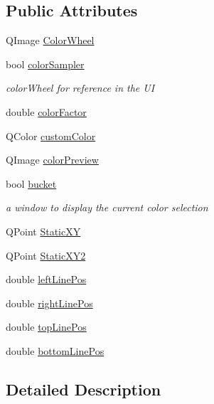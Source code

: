 \subsection*{Public Attributes}
\begin{DoxyCompactItemize}
\item 
Q\-Image \hyperlink{classworkingwindow_ab9ed1f2dafd42f388fc7b366d25db626}{Color\-Wheel}
\item 
bool \hyperlink{classworkingwindow_ab1e5dc3b626cb9e28983e6abee34d10d}{color\-Sampler}
\begin{DoxyCompactList}\small\item\em color\-Wheel for reference in the U\-I \end{DoxyCompactList}\item 
double \hyperlink{classworkingwindow_aee9919c1cfad4526c7b66c5f09b8ce02}{color\-Factor}
\item 
Q\-Color \hyperlink{classworkingwindow_a44fa7af5c036e2686e55c31a3b69e81f}{custom\-Color}
\item 
Q\-Image \hyperlink{classworkingwindow_a470b6dd89240fb31393ee848cef5a358}{color\-Preview}
\item 
bool \hyperlink{classworkingwindow_a48d7fd2e19079e21a8474ae0519f0862}{bucket}
\begin{DoxyCompactList}\small\item\em a window to display the current color selection \end{DoxyCompactList}\item 
Q\-Point \hyperlink{classworkingwindow_aa0c6e8030d9bb3b26324aaf737f2be62}{Static\-X\-Y}
\item 
Q\-Point \hyperlink{classworkingwindow_a0574618dfbe458eee7fac25620c2cf89}{Static\-X\-Y2}
\item 
double \hyperlink{classworkingwindow_a9e3b2de905cba0520347811c530958da}{left\-Line\-Pos}
\item 
double \hyperlink{classworkingwindow_ad140ff2651f5e7993503d5d862e4d385}{right\-Line\-Pos}
\item 
double \hyperlink{classworkingwindow_a1d4abbc294787013faaa0b6f2ee25a2d}{top\-Line\-Pos}
\item 
double \hyperlink{classworkingwindow_a122ed0dce6353c78902353ceeda6bee0}{bottom\-Line\-Pos}
\end{DoxyCompactItemize}


\subsection{Detailed Description}


